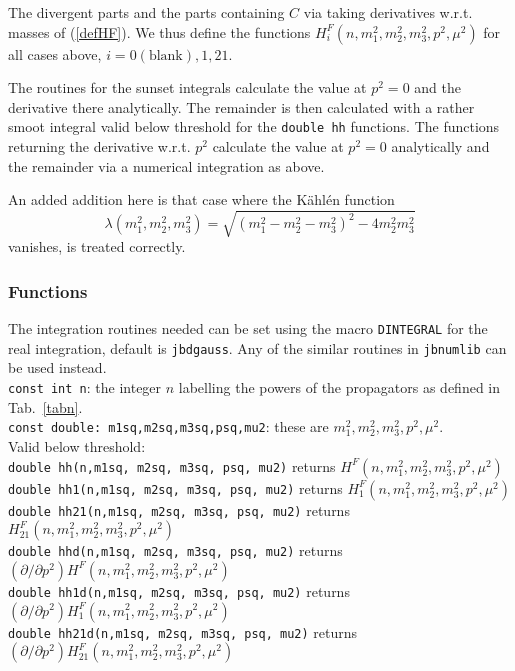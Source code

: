 \documentclass[12pt,a4paper]{article}
\newcommand{\mytt}[1]{\texttt{#1}}
\newcommand{\newfunction}[1]{\mytt{#1}\index{\mytt{#1}}}
\begin{document}
The divergent parts and the parts containing
$C$ via taking derivatives w.r.t. masses of (\ref{defHF}).
We thus define the functions $H^F_i(n,m_1^2,m_2^2,m_3^2,p^2,\mu^2)$
for all cases above, $i=0(\text{blank}),1,21$.

The routines for the sunset integrals calculate the value at $p^2=0$
and the derivative there analytically. The remainder is then calculated
with a rather smoot integral valid below threshold for the
\mytt{double hh} functions.
The functions returning the derivative w.r.t. $p^2$
calculate the value at $p^2=0$ analytically and the remainder via
a numerical integration as above.

An added addition here is that case where the K\"ahl\'en function
$$\lambda(m_1^2,m_2^2,m_3^2)=\sqrt{(m_1^2-m_2^2-m_3^2)^2-4m_2^2m_3^2}$$
vanishes, is treated correctly.

\subsubsection{Functions}

The integration routines needed can be set using the macro \newfunction{DINTEGRAL}
for the real integration, default is \mytt{jbdgauss}.
Any of the similar routines in \mytt{jbnumlib} can
be used instead.\\
 
\mytt{const int n}: the integer $n$ labelling the powers of the propagators as
defined in Tab.~\ref{tabn}.\\
\mytt{const double: m1sq,m2sq,m3sq,psq,mu2}: these are
$m_1^2,m_2^2,m_3^2,p^2,\mu^2$.\\

Valid below threshold:\\
\mytt{double \newfunction{hh}(n,m1sq, m2sq, m3sq, psq, mu2)} returns
 $H^F(n,m_1^2,m_2^2,m_3^2,p^2,\mu^2)$\\
\mytt{double \newfunction{hh1}(n,m1sq, m2sq, m3sq, psq, mu2)} returns
 $H^F_1(n,m_1^2,m_2^2,m_3^2,p^2,\mu^2)$\\
\mytt{double \newfunction{hh21}(n,m1sq, m2sq, m3sq, psq, mu2)} returns
 $H^F_{21}(n,m_1^2,m_2^2,m_3^2,p^2,\mu^2)$\\
\mytt{double \newfunction{hhd}(n,m1sq, m2sq, m3sq, psq, mu2)} returns
 $(\partial/\partial p^2)H^F(n,m_1^2,m_2^2,m_3^2,p^2,\mu^2)$\\
\mytt{double \newfunction{hh1d}(n,m1sq, m2sq, m3sq, psq, mu2)} returns
 $(\partial/\partial p^2)H^F_1(n,m_1^2,m_2^2,m_3^2,p^2,\mu^2)$\\
\mytt{double \newfunction{hh21d}(n,m1sq, m2sq, m3sq, psq, mu2)} returns
 $(\partial/\partial p^2)H^F_{21}(n,m_1^2,m_2^2,m_3^2,p^2,\mu^2)$\\
\end{document}
